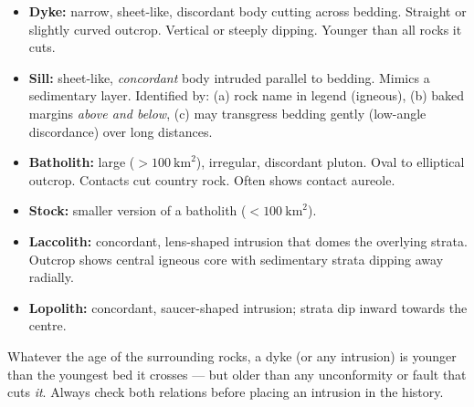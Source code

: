 \documentclass[11pt]{article}
\begin{document}
\begin{definition}
\begin{itemize}
\item \textbf{Dyke:} narrow, sheet-like, discordant body cutting across bedding. Straight or slightly curved outcrop. Vertical or steeply dipping. Younger than all rocks it cuts.
\item \textbf{Sill:} sheet-like, \emph{concordant} body intruded parallel to bedding. Mimics a sedimentary layer. Identified by: (a) rock name in legend (igneous), (b) baked margins \emph{above and below}, (c) may transgress bedding gently (low-angle discordance) over long distances.
\item \textbf{Batholith:} large ($> 100\ \mathrm{km}^2$), irregular, discordant pluton. Oval to elliptical outcrop. Contacts cut country rock. Often shows contact aureole.
\item \textbf{Stock:} smaller version of a batholith ($< 100\ \mathrm{km}^2$).
\item \textbf{Laccolith:} concordant, lens-shaped intrusion that domes the overlying strata. Outcrop shows central igneous core with sedimentary strata dipping away radially.
\item \textbf{Lopolith:} concordant, saucer-shaped intrusion; strata dip inward towards the centre.
\end{itemize}
\end{definition}

\begin{attention}
Whatever the age of the surrounding rocks, a dyke (or any intrusion) is younger than the youngest bed it crosses — but older than any unconformity or fault that cuts \emph{it}. Always check both relations before placing an intrusion in the history.
\end{attention}
\end{document}
